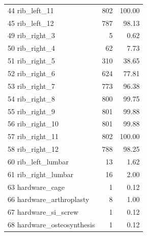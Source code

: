 \begin{table}[htbp]
\begin{ruledtabular}
\begin{tabular}{lrr}
44 rib\_left\_11 & 802 & 100.00 \\
45 rib\_left\_12 & 787 & 98.13 \\
49 rib\_right\_3 & 5 & 0.62 \\
50 rib\_right\_4 & 62 & 7.73 \\
51 rib\_right\_5 & 310 & 38.65 \\
52 rib\_right\_6 & 624 & 77.81 \\
53 rib\_right\_7 & 773 & 96.38 \\
54 rib\_right\_8 & 800 & 99.75 \\
55 rib\_right\_9 & 801 & 99.88 \\
56 rib\_right\_10 & 801 & 99.88 \\
57 rib\_right\_11 & 802 & 100.00 \\
58 rib\_right\_12 & 788 & 98.25 \\
60 rib\_left\_lumbar & 13 & 1.62 \\
61 rib\_right\_lumbar & 16 & 2.00 \\
63 hardware\_cage & 1 & 0.12 \\
66 hardware\_arthroplasty & 8 & 1.00 \\
67 hardware\_si\_screw & 1 & 0.12 \\
68 hardware\_osteosynthesis & 1 & 0.12 \\
\end{tabular}
\end{ruledtabular}
\end{table}
